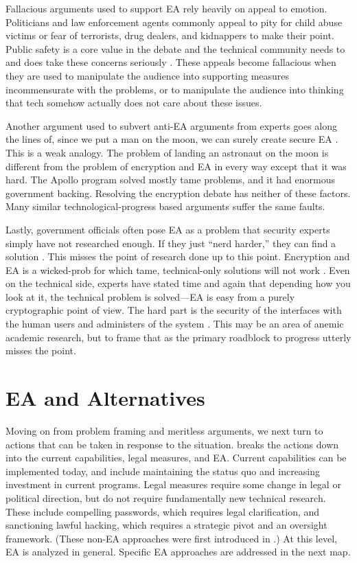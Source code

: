 Fallacious arguments used to support \ac{EA} rely heavily on appeal to emotion. Politicians and law enforcement agents
commonly appeal to pity for child abuse victims or fear of terrorists, drug dealers, and kidnappers to make their point.
Public safety is a core value in the debate and the technical community needs to and does take these concerns seriously
\cite{schneier_scaring_2019}. These appeals become fallacious when they are used to manipulate the audience into
supporting measures incommensurate with the problems, or to manipulate the audience into thinking that tech somehow
actually does not care about these issues.

Another argument used to subvert anti-EA arguments from experts goes along the lines of, since we put a man on the moon,
we can surely create secure \ac{EA} \cite{cushing_moon_2018}. This is a weak analogy. The problem of landing an
astronaut on the moon is different from the problem of encryption and \ac{EA} in every way except that it was hard. The
Apollo program solved mostly tame problems, and it had enormous government backing. Resolving the encryption debate has
neither of these factors. Many similar technological-progress based arguments suffer the same faults.

Lastly, government officials often pose \ac{EA} as a problem that security experts simply have not researched enough. If
they just ``nerd harder,'' they can find a solution \cite{schneier_2019}. This misses the point of research done up to
this point. Encryption and \ac{EA} is a \ac{wicked-prob} for which tame, technical-only solutions will not work
\cite{rozenshtein_wicked_2018}. Even on the technical side, experts have stated time and again that depending how you
look at it, the technical problem is solved---\ac{EA} is easy from a purely cryptographic point of view. The hard part
is the security of the interfaces with the human users and administers of the system \cite{abelson_risks_1997}
\cite{abelson_2015}. This may be an area of anemic academic research, but to frame that as the primary roadblock to
progress utterly misses the point.


\section{EA and Alternatives}

Moving on from problem framing and meritless arguments, we next turn to actions that can be taken in response to the
situation.  breaks the actions down into the current capabilities, legal measures, and \ac{EA}.
Current capabilities can be implemented today, and include maintaining the status quo and increasing investment in
current programs. Legal measures require some change in legal or political direction, but do not require fundamentally
new technical research. These include compelling passwords, which requires legal clarification, and sanctioning lawful
hacking, which requires a strategic pivot and an oversight framework. (These non-\ac{EA} approaches were first
introduced in .) At this level, \ac{EA} is analyzed in general. Specific EA approaches are
addressed in the next map.

